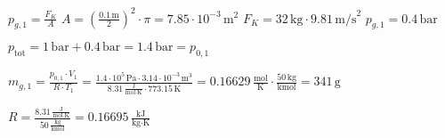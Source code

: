 \( p_{g,1} = \frac{F_K}{A} \)  
\( A = \left(\frac{0.1 \, \text{m}}{2}\right)^2 \cdot \pi = 7.85 \cdot 10^{-3} \, \text{m}^2 \)  
\( F_K = 32 \, \text{kg} \cdot 9.81 \, \text{m/s}^2 \)  
\( p_{g,1} = 0.4 \, \text{bar} \)  

\( p_{\text{tot}} = 1 \, \text{bar} + 0.4 \, \text{bar} = 1.4 \, \text{bar} = p_{0,1} \)  

\( m_{g,1} = \frac{p_{0,1} \cdot V_1}{R \cdot T_1} = \frac{1.4 \cdot 10^5 \, \text{Pa} \cdot 3.14 \cdot 10^{-3} \, \text{m}^3}{8.31 \, \frac{\text{J}}{\text{mol} \cdot \text{K}} \cdot 773.15 \, \text{K}} = 0.16629 \, \frac{\text{mol}}{\text{K}} \cdot \frac{50 \, \text{kg}}{\text{kmol}} = 341 \, \text{g} \)  

\( R = \frac{8.31 \, \frac{\text{J}}{\text{mol} \cdot \text{K}}}{50 \, \frac{\text{kg}}{\text{kmol}}} = 0.16695 \, \frac{\text{kJ}}{\text{kg} \cdot \text{K}} \)